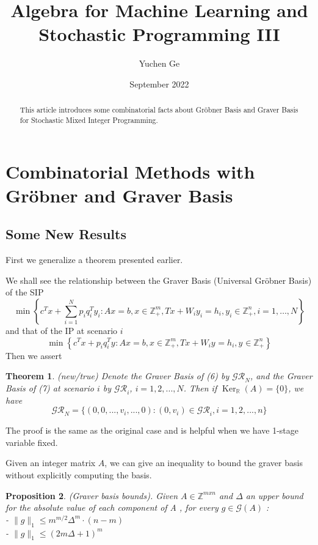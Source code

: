 \documentclass{article}
\title{Algebra for Machine Learning and Stochastic Programming III}
\author{Yuchen Ge}
\date{September 2022}
\theoremstyle{plain}
\newtheorem{theorem}{Theorem}[section]
\newtheorem{proposition}[theorem]{Proposition}
\theoremstyle{definition}
\begin{document}
\maketitle
\tableofcontents
\newpage

\begin{abstract}
This article introduces some combinatorial facts about Gröbner Basis and Graver Basis for Stochastic Mixed Integer Programming.
\end{abstract}
\section{Combinatorial Methods with Gröbner and Graver Basis}

\subsection{Some New Results}

First we generalize a theorem presented earlier.

We shall see the relationship between the Graver Basis (Universal Gröbner Basis) of the SIP 
\begin{equation}
\min \left\{c^{T} x+\sum_{i=1}^{N} p_{i} q_{i}^{T} y_{i}: A x= b, x  \in \mathbb{Z}_{+}^{m}, T x+W_{i} y_{i}=h_{i}, y_{i}  \in \mathbb{Z}_{+}^{n}, i=1, \ldots, N\right\}
\end{equation}
and that of the IP at scenario $i$
\begin{equation}
\min \left\{c^{T} x+ p_{i} q_{i}^{T} y_{}: A x = b, x  \in \mathbb{Z}_{+}^{m}, T x+W_{i} y_{}=h_{i}, y_{}  \in \mathbb{Z}_{+}^{n} \right\}
\end{equation}
Then we assert \\

\begin{theorem} (new/true) Denote the  Graver Basis of  (6) by $\mathcal{GR}_{N}$, and the  Graver Basis of (7) at scenario $i$ by $\mathcal{GR}_{i}$, $i=1,2,...,N$. Then if $\operatorname{Ker}_{\mathbb{R}}(A)=\{0\}$, we have $$\mathcal{GR}_{N}=\{(0,0,...,v_i,...,0):(0,v_i)\in \mathcal{GR}_{i},i=1,2,...,n\}$$\end{theorem}

The proof is the same as the original case and is helpful when we have 1-stage variable fixed.

Given an integer matrix $A$, we can give an inequality to bound the graver basis without explicitly computing the basis.

\begin{proposition} (Graver basis bounds). Given  $A \in \mathbb{Z}^{m x n}$  and  $\Delta$  an upper bound for the absolute value of each component of  A , for every  $g \in \mathcal{G}(A) $ :\\
\indent -  $\|g\|_{1} \leq m^{m / 2} \Delta^{m} \cdot(n-m) \quad$ \cite{ref1}\\
\indent -  $\|g\|_{1} \leq (2 m \Delta+1)^{m}$ \cite{ref2} \\
\end{proposition}
\end{document}
